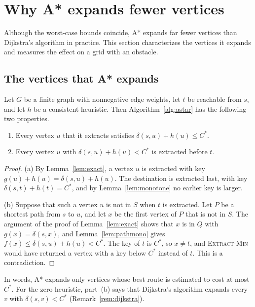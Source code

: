 \section{Why A* expands fewer vertices}\label{sec:efficiency}

Although the worst-case bounds coincide, A* expands far fewer vertices than
Dijkstra's algorithm in practice. This section characterizes the vertices it
expands and measures the effect on a grid with an obstacle.

\subsection{The vertices that A* expands}\label{sec:expanded}

\begin{proposition}\label{prop:expanded}
Let $G$ be a finite graph with nonnegative edge weights, let $t$ be reachable
from $s$, and let $h$ be a consistent heuristic. Then Algorithm~\ref{alg:astar}
has the following two properties.
\begin{enumerate}[label=(\alph*)]
  \item Every vertex $u$ that it extracts satisfies
    $\delta(s,u) + h(u) \le C^{*}$.
  \item Every vertex $u$ with $\delta(s,u) + h(u) < C^{*}$ is extracted before
    $t$.
\end{enumerate}
\end{proposition}

\begin{proof}
(a) By Lemma~\ref{lem:exact}, a vertex $u$ is extracted with key
$g(u) + h(u) = \delta(s,u) + h(u)$. The destination is extracted last, with key
$\delta(s,t) + h(t) = C^{*}$, and by Lemma~\ref{lem:monotone} no earlier key is
larger.

(b) Suppose that such a vertex $u$ is not in $S$ when $t$ is extracted. Let $P$
be a shortest path from $s$ to $u$, and let $x$ be the first vertex of $P$ that
is not in $S$. The argument of the proof of Lemma~\ref{lem:exact} shows that $x$
is in $Q$ with $g(x) = \delta(s,x)$, and Lemma~\ref{lem:pathmono} gives
$f(x) \le \delta(s,u) + h(u) < C^{*}$. The key of $t$ is $C^{*}$, so $x \neq t$,
and \textsc{Extract-Min} would have returned a vertex with a key below $C^{*}$
instead of $t$. This is a contradiction.
\end{proof}

In words, A* expands only vertices whose best route is estimated to cost at
most $C^{*}$. For the zero heuristic, part~(b) says that Dijkstra's algorithm
expands every $v$ with $\delta(s,v) < C^{*}$ (Remark~\ref{rem:dijkstra}).

